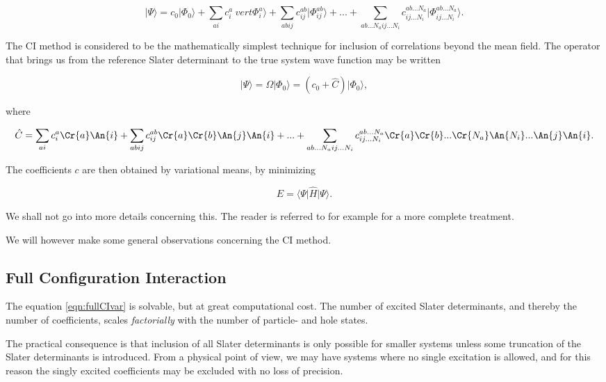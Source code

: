 \begin{equation}
\vert \Psi \rangle = c_0 \vert \Phi_0 \rangle + \sum_{ai} c^{a}_i\ vert \Phi_i^a \rangle +  \sum_{abij} c^{ab}_{ij} \vert \Phi_{ij}^{ab} \rangle + ... + \sum_{ab...N_a ij...N_i} c^{ab...N_a}_{ij...N_i} \vert \Phi_{ij...N_i}^{ab...N_a} \rangle.
\label{eqn:fullCI}
\end{equation}

The CI method is considered to be the mathematically simplest technique for inclusion of correlations beyond the mean field. \cite{Harris} The operator that brings us from the reference Slater determinant to the true system wave function may be written

\begin{equation}
\vert \Psi \rangle = \Omega \vert  \Phi_0 \rangle = (c_0 + \hat{C}) \vert  \Phi_0 \rangle,
\end{equation}

where

\begin{equation}
\hat{C} = \sum_{ai} c^{a}_i \Cr{a} \An{i}+  \sum_{abij} c^{ab}_{ij} \Cr{a} \Cr{b} \An{j} \An{i} + ... + \sum_{ab...N_a ij...N_i} c^{ab...N_a}_{ij...N_i} \Cr{a} \Cr{b} ... \Cr{N_a} \An{N_i} ... \An{j} \An{i}.
\end{equation}

The coefficients $c$ are then obtained by variational means, by minimizing 

\begin{equation}
E = \langle \Psi \vert \hat{H} \vert \Psi \rangle.
\label{eqn:fullCIvar}
\end{equation}

We shall not go into more details concerning this. The reader is referred to for example \cite[p.177]{Harris} for a more complete treatment. 

We will however make some general observations concerning the CI method. 

\subsection{Full Configuration Interaction}

The equation \ref{eqn:fullCIvar} is solvable, but at great computational cost. The number of excited Slater determinants, and thereby the number of coefficients, scales \emph{factorially} with the number of particle- and hole states.

The practical consequence is that inclusion of all Slater determinants is only possible for smaller systems unless some truncation of the Slater determinants is introduced. From a physical point of view, we may have systems where no single excitation is allowed, and for this reason the singly excited coefficients may be excluded with no loss of precision.

